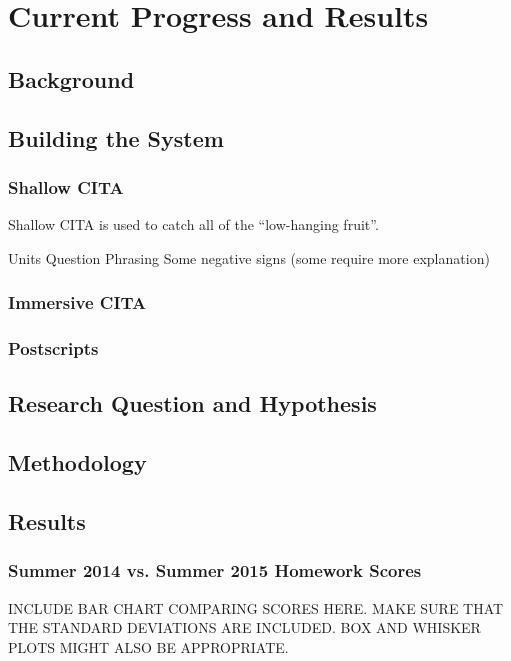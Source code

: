\chapter[Chapter 6: Current Progress and Results]{Current Progress and Results}

\section{Background}

\section{Building the System}

\subsection{Shallow CITA}

Shallow CITA is used to catch all of the ``low-hanging fruit''.

Units
Question Phrasing
Some negative signs (some require more explanation)

\subsection{Immersive CITA}

\subsection{Postscripts}

\section{Research Question and Hypothesis}

\section{Methodology}

\section{Results}

\subsection{Summer 2014 vs. Summer 2015 Homework Scores}

INCLUDE BAR CHART COMPARING SCORES HERE. MAKE SURE THAT THE STANDARD DEVIATIONS ARE INCLUDED. BOX AND WHISKER PLOTS MIGHT ALSO BE APPROPRIATE.